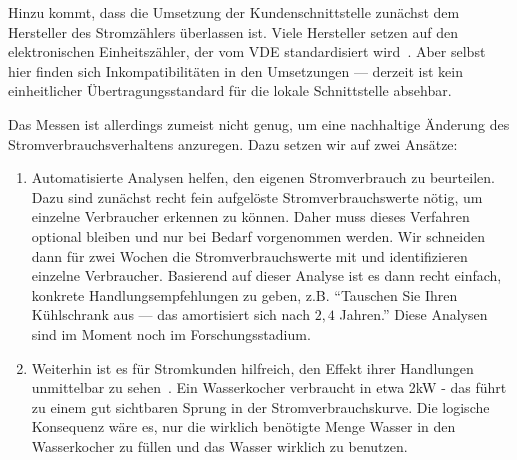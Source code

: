 \documentclass[logo]{fhgart}
\begin{document}
Hinzu kommt, dass die Umsetzung der Kundenschnittstelle zunächst dem
Hersteller des Stromzählers überlassen ist. Viele Hersteller setzen auf den
elektronischen Einheitszähler, der vom VDE 
standardisiert wird~\cite{fnn10lastenheft}. Aber
selbst hier finden sich Inkompatibilitäten in den Umsetzungen ---
derzeit ist kein einheitlicher Übertragungsstandard für die lokale
Schnittstelle absehbar.

Das Messen ist allerdings zumeist nicht genug, um eine nachhaltige
Änderung des Stromverbrauchsverhaltens anzuregen. Dazu setzen wir auf
zwei Ansätze:

\begin{enumerate}
  \item Automatisierte Analysen helfen, den eigenen
    Stromverbrauch zu beurteilen. Dazu sind zunächst recht fein
    aufgelöste Stromverbrauchswerte nötig, um einzelne Verbraucher
    erkennen zu können. Daher muss dieses Verfahren optional bleiben und
    nur bei Bedarf vorgenommen werden. Wir schneiden dann für zwei
    Wochen die Stromverbrauchswerte mit und identifizieren einzelne
    Verbraucher. Basierend auf dieser Analyse ist es dann recht einfach,
    konkrete Handlungsempfehlungen zu geben, z.B. "`Tauschen Sie Ihren
    Kühlschrank aus --- das amortisiert sich nach $2,4$ Jahren."' 
    Diese Analysen sind im Moment noch im Forschungsstadium.
  \item Weiterhin ist es für Stromkunden hilfreich, den Effekt ihrer
    Handlungen unmittelbar zu sehen~\cite{darby2006feedback}. Ein Wasserkocher 
    verbraucht in etwa 2kW - das führt zu einem
    gut sichtbaren Sprung in der Stromverbrauchskurve. Die logische
    Konsequenz wäre es, nur die wirklich benötigte Menge Wasser in den
    Wasserkocher zu füllen und das Wasser wirklich zu benutzen.
\end{enumerate}
\end{document}
